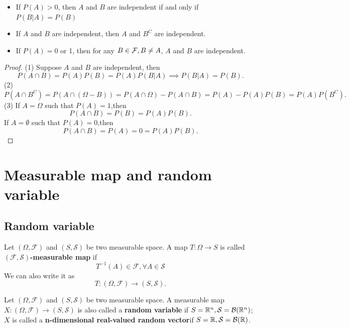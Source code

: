 \begin{refsection}
\begin{lemma}\cite{dineen2013probability}\hfill
	\begin{itemize} 
		\item If $P(A) > 0 $, then $A$ and $B$ are independent if and only if $P(B|A) = P(B)$
		\item If $A$ and $B$ are independent, then $A$ and $B^C$ are independent.
		\item If $P(A)=0$ or 1, then for any $B\in \mathcal{F},B\neq A$, $A$ and $B$ are independent.    
	\end{itemize}
\end{lemma}
\begin{proof}
	(1) Suppose $A$ and $B$ are independent, then
	$$P(A\cap B) = P(A)P(B) = P(A)P(B|A)\implies P(B|A) = P(B).$$
	(2) $$P(A\cap B^C) = P(A \cap (\Omega - B)) = P(A\cap \Omega) - P(A\cap B) = P(A) - P(A)P(B) = P(A)P(B^C).$$
	(3) If $A = \Omega$ such that $P(A) = 1$,then
	$$P(A\cap B) = P(B) = P(A)P(B).$$	
	If $A = \emptyset$ such that $P(A) = 0$,then
	$$P(A\cap B) = P(A) = 0 = P(A)P(B).$$
\end{proof}




\section{Measurable map and random variable}
\subsection{Random variable}
\begin{definition}\cite{fries2007mathematical}
Let $(\Omega,\mathcal{F})$ and $(S,\mathcal{S})$ be two measurable space.
 A map $T:\Omega \rightarrow S$ is called $(\mathcal{F},\mathcal{S})$\textbf{-measurable map} if
    $$T^{-1}(A)\in \mathcal{F}, \forall A\in \mathcal{S}$$We can also write it as $$T:(\Omega,\mathcal{F})\rightarrow (S,\mathcal{S}).$$
\end{definition}



\begin{definition}
Let $(\Omega,\mathcal{F})$ and $(S,\mathcal{S})$ be two measurable space.	
    A measurable map $X:(\Omega,\mathcal{F})\rightarrow (S,\mathcal{S})$ is also called a \textbf{random variable} if $S=\mathbb{R}^n,\mathcal{S}=\mathcal{B}(\mathbb{R}^n)$; $X$ is called a \textbf{n-dimensional real-valued random vector}if $S=\mathbb{R},\mathcal{S}=\mathcal{B}(\mathbb{R})$.	
\end{definition}


\end{refsection}
